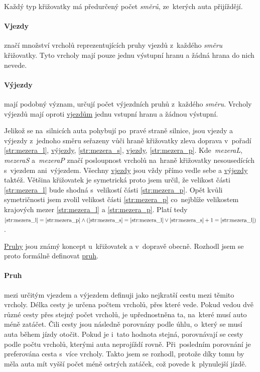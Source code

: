 Každý typ křižovatky má předurčený počet \emph{směrů}, ze~kterých auta přijíždějí.

\paragraph{Vjezdy}\label{par:vjezdy} značí množství vrcholů reprezentujících pruhy vjezdů z~každého \emph{směru} křižovatky.
Tyto vrcholy mají pouze jednu výstupní hranu a žádná hrana do nich nevede.

\paragraph{Výjezdy}\label{par:vyjezdy} mají podobný význam, určují počet výjezdních pruhů z~každého \emph{směru}.
Vrcholy výjezdů mají oproti \hyperref[par:vjezdy]{vjezdům} jednu vstupní hranu a žádnou výstupní.

Jelikož se na~silnicích auta pohybují po~pravé straně silnice,
jsou vjezdy a výjezdy z~jednoho směru seřazeny vůči hraně křižovatky zleva doprava v~pořadí
\ref{str:mezera_l}, \hyperref[par:vyjezdy]{výjezdy}, \ref{str:mezera_s}, \hyperref[par:vyjezdy]{vjezdy}, \ref{str:mezera_p}.
Kde~\emph{mezeraL}, \emph{mezeraS}
a~\emph{mezeraP} značí posloupnost vrcholů na~hraně křižovatky
nesousedících s~vjezdem ani~výjezdem.
Všechny \hyperref[par:vjezdy]{vjezdy} jsou vždy přímo vedle sebe a \hyperref[par:vyjezdy]{výjezdy} taktéž.
Většina křižovatek je symetrická proto jsem určil, že velikost části \ref{str:mezera_l} bude shodná s~velikostí části \ref{str:mezera_p}.
Opět kvůli symetričnosti jsem zvolil velikost části \ref{str:mezera_p} co~nejblíže velikostem
krajových mezer \ref{str:mezera_l} a \ref{str:mezera_p}.
Platí tedy $\ref{str:mezera_l}=\ref{str:mezera_p}\wedge(\ref{str:mezera_s}=\ref{str:mezera_l}\vee\ref{str:mezera_s}+1=\ref{str:mezera_l})$.

\hyperref[par:pruh]{Pruhy} jsou známý koncept u~křižovatek a v~dopravě obecně.
Rozhodl jsem se proto formálně definovat \hyperref[par:pruh]{pruh}.

\paragraph{Pruh}\label{par:pruh} mezi určitým vjezdem a výjezdem definuji jako nejkratší cestu mezi těmito vrcholy.
Délka cesty je určena počtem vrcholů, přes které vede.
Pokud vedou dvě různé cesty přes stejný počet vrcholů, je upřednostněna ta, na~které musí auto méně zatáčet.
Čili cesty jsou následně porovnány podle úhlu, o~který se musí auta během jízdy otočit.
Pokud je i~tato hodnota stejná, porovnávají se cesty podle počtu vrcholů, kterými auta neprojíždí rovně.
Při~posledním porovnání je preferována cesta s~více vrcholy.
Takto jsem se rozhodl, protože díky tomu by měla auta mít vyšší počet méně ostrých zatáček,
což povede k~plynulejší jízdě.

